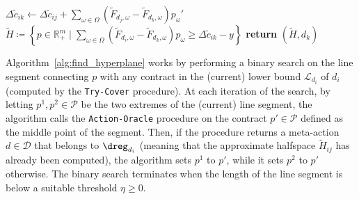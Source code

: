 \begin{algorithm}[H]
\begin{algorithmic}[1]
		\Else {}
		\State $\Delta \widetilde{c}_{ik} \gets \Delta \widetilde{c}_{ij} + \sum\limits_{\omega \in \Omega} \left(  \widetilde{F}_{d_{j},\omega} -  \widetilde{F}_{d_{k},\omega} \right) p_{\omega}' $ \label{line:def_delta_cost_2}
		\EndIf
		\State $\widetilde{H} \coloneqq \left\{ p \in \mathbb{R}_{+}^m \mid \sum\limits_{\omega \in \Omega} \left(  \widetilde{F}_{d_{i},\omega} -  \widetilde{F}_{d_{k},\omega} \right) p_{\omega} \ge \Delta \widetilde{c}_{ik}-y  \right\}$\label{line:calc_hp_2}
		\State \textbf{return} $(\widetilde{H},d_k)$
	\end{algorithmic}
\end{algorithm}



Algorithm~\ref{alg:find_hyperplane} works by performing a binary search on the line segment connecting $p$ with any contract in the (current) lower bound $\mathcal{L}_{d_i}$ of $d_i$ (computed by the \texttt{Try-Cover} procedure).
%
At each iteration of the search, by letting $p^1,p^2 \in \mathcal{P}$ be the two extremes of the (current) line segment, the algorithm calls the \texttt{Action-Oracle} procedure on the contract $p' \in \mathcal{P}$ defined as the middle point of the segment.
%
Then, if the procedure returns a meta-action $d \in \mathcal{D}$ that belongs to $\dreg_{d_i}$ (meaning that the approximate halfspace $\widetilde{H}_{i j}$ has already been computed), the algorithm sets $p^1 $ to $ p'$, while it sets $p^2$ to $p'$ otherwise.
%
The binary search terminates when the length of the line segment is below a suitable threshold $\eta \ge 0$.
%

